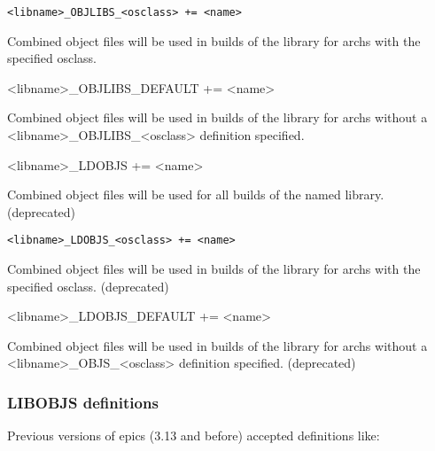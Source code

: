 \begin{description}\item \verb|<libname>_OBJLIBS_<osclass> += <name>| 

\end{description}Combined object files will be used in builds of the library for archs with the specified osclass.

\begin{description}\item \textless{}libname\textgreater{}\_OBJLIBS\_DEFAULT += \textless{}name\textgreater{}

\end{description}Combined object files will be used in builds of the library for archs without a 
\textless{}libname\textgreater{}\_OBJLIBS\_\textless{}osclass\textgreater{} definition specified.



\begin{description}\item \textless{}libname\textgreater{}\_LDOBJS += \textless{}name\textgreater{}

\end{description}Combined object files will be used for all builds of the named library. (deprecated)

\begin{description}\item \verb|<libname>_LDOBJS_<osclass> += <name>| 

\end{description}Combined object files will be used in builds of the library for archs with the specified osclass. (deprecated)

\begin{description}\item \textless{}libname\textgreater{}\_LDOBJS\_DEFAULT += \textless{}name\textgreater{}

\end{description}Combined object files will be used in builds of the library for archs without a \textless{}libname\textgreater{}\_OBJS\_\textless{}osclass\textgreater{} 
definition specified. (deprecated)

\subsubsection{ LIBOBJS definitions}

Previous versions of epics (3.13 and before) accepted definitions like:

